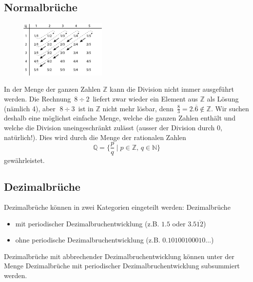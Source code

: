 \documentclass[%
11pt,%
twoside,%
titlepage,%
swissgerman,%
headsepline%
]{scrartcl}
\theoremstyle{definition}
\theoremstyle{plain}
\begin{document}
\subsection{Normalbrüche}
\begin{figure}
\vspace{-22pt}
  \begin{center}
    \includegraphics[width=0.38\textwidth]{pictures/Cantor}
  \end{center}
\vspace{-22pt}
\end{figure}
In der Menge der ganzen Zahlen $\mathbb{Z}$ kann die Division nicht immer
ausgeführt werden.
\bsp Die Rechnung $\,8\div 2\,$ liefert zwar wieder ein Element aus $\mathbb{Z}$ als Lösung (nämlich 4), aber $\;8\div 3\,$ ist in $\mathbb{Z}$ nicht mehr lösbar, denn $\,\frac{8}{3}=2.\overline{6}\notin\mathbb{Z}$. 
Wir suchen deshalb eine möglichst einfache Menge, welche die ganzen Zahlen enthält und welche die Division uneingeschränkt zulässt (ausser der Division durch 0, natürlich!).
Dies wird durch die Menge der rationalen Zahlen
$$\mathbb{Q} = \{\frac{p}{q}\mid p\in\mathbb{Z},\,q\in\mathbb{N}\}$$
gewährleistet.

\subsection{Dezimalbrüche}

Dezimalbrüche können in zwei Kategorien eingeteilt werden: Dezimalbrüche 
\begin{itemize}
	\item mit periodischer Dezimalbruchentwicklung (z.B. $1.5$ oder $3.5\overline{12}$)
	\item ohne periodische Dezimalbruchentwicklung (z.B. $0.10100100010\dots$)
\end{itemize}

Dezimalbrüche mit abbrechender Dezimalbruchentwicklung können unter der Menge Dezimalbrüche mit periodischer Dezimalbruchentwicklung subsummiert werden.
\end{document}
